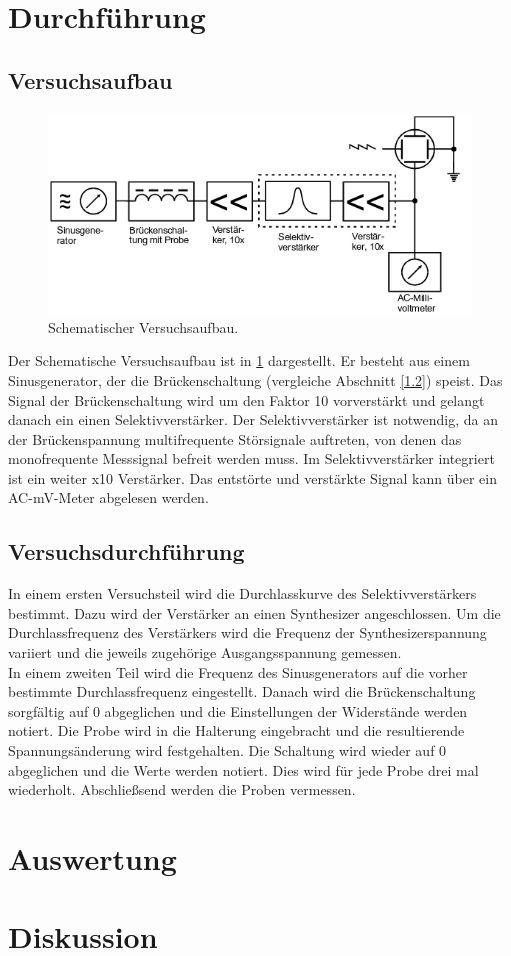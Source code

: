 \section{Durchführung}
\subsection{Versuchsaufbau}
\begin{figure}
  \centering
  \includegraphics[scale=0.5]{Aufbau.png}
  \caption{Schematischer Versuchsaufbau\cite{anleitung}.}
  \label{abb:2}
\end{figure}
Der Schematische Versuchsaufbau ist in \ref{abb:2} dargestellt. Er besteht aus einem Sinusgenerator,
der die Brückenschaltung (vergleiche Abschnitt \ref{1.2}) speist. Das Signal der Brückenschaltung
wird um den Faktor 10 vorverstärkt und gelangt danach ein einen Selektivverstärker.
Der Selektivverstärker ist notwendig, da an der Brückenspannung multifrequente
Störsignale auftreten, von denen das monofrequente Messsignal befreit werden muss.
Im Selektivverstärker integriert ist ein weiter x10 Verstärker. Das entstörte und verstärkte
Signal kann über ein AC-\si{\milli\volt}-Meter abgelesen werden.
\subsection{Versuchsdurchführung}
In einem ersten Versuchsteil wird die Durchlasskurve des Selektivverstärkers bestimmt.
Dazu wird der Verstärker an einen Synthesizer angeschlossen. Um die Durchlassfrequenz des
Verstärkers wird die Frequenz der Synthesizerspannung variiert und die jeweils zugehörige
Ausgangsspannung gemessen.\\
\noindent
In einem zweiten Teil wird die Frequenz des Sinusgenerators auf die vorher bestimmte
Durchlassfrequenz eingestellt. Danach wird die Brückenschaltung sorgfältig auf 0 abgeglichen
und die Einstellungen der Widerstände werden notiert. Die Probe wird in die Halterung eingebracht
und die resultierende Spannungsänderung wird festgehalten. Die Schaltung wird wieder
auf 0 abgeglichen und die Werte werden notiert. Dies wird für jede Probe drei mal wiederholt.
Abschließsend werden die Proben vermessen.
\section{Auswertung}
\section{Diskussion}
\newpage
\nocite{*}
\printbibliography
